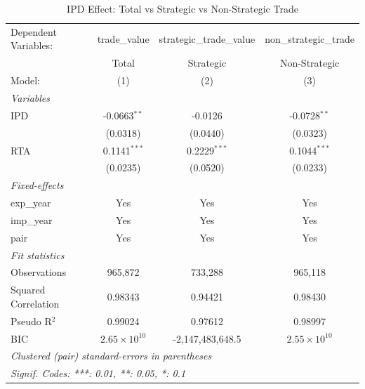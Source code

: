 
\begin{table}[htbp]
   \caption{IPD Effect: Total vs Strategic vs Non-Strategic Trade}
   \centering
   \begin{tabular}{lccc}
      \tabularnewline \midrule \midrule
      Dependent Variables: & trade\_value          & strategic\_trade\_value   & non\_strategic\_trade\\    
                           & Total                 & Strategic                 & Non-Strategic \\   
      Model:               & (1)                   & (2)                       & (3)\\  
      \midrule
      \emph{Variables}\\
      IPD                  & -0.0663$^{**}$        & -0.0126                   & -0.0728$^{**}$\\   
                           & (0.0318)              & (0.0440)                  & (0.0323)\\   
      RTA                  & 0.1141$^{***}$        & 0.2229$^{***}$            & 0.1044$^{***}$\\   
                           & (0.0235)              & (0.0520)                  & (0.0233)\\   
      \midrule
      \emph{Fixed-effects}\\
      exp\_year            & Yes                   & Yes                       & Yes\\  
      imp\_year            & Yes                   & Yes                       & Yes\\  
      pair                 & Yes                   & Yes                       & Yes\\  
      \midrule
      \emph{Fit statistics}\\
      Observations         & 965,872               & 733,288                   & 965,118\\  
      Squared Correlation  & 0.98343               & 0.94421                   & 0.98430\\  
      Pseudo R$^2$         & 0.99024               & 0.97612                   & 0.98997\\  
      BIC                  & $2.65\times 10^{10}$  & -2,147,483,648.5          & $2.55\times 10^{10}$\\   
      \midrule \midrule
      \multicolumn{4}{l}{\emph{Clustered (pair) standard-errors in parentheses}}\\
      \multicolumn{4}{l}{\emph{Signif. Codes: ***: 0.01, **: 0.05, *: 0.1}}\\
   \end{tabular}
\end{table}


